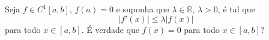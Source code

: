 Seja \(f\in C^1[a,b]\), \(f(a)=0\) e suponha que \(\lambda\in\mathbb R\), \(\lambda >0\), é tal que
\[|f'(x)|\leq \lambda |f(x)|\]para todo \(x\in [a,b]\). É verdade que \(f(x)=0\) para todo \(x\in [a,b]\)?
